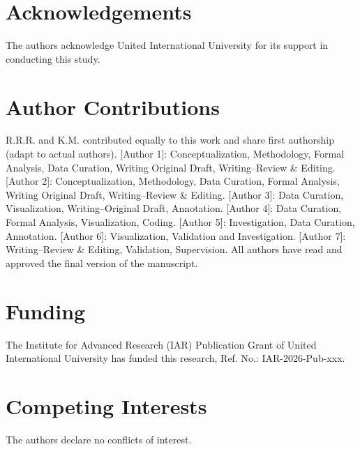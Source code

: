 \documentclass{article}
\begin{document}
\makeatletter
\renewcommand{\@biblabel}[1]{#1.\hfill}
\makeatother




\section*{Acknowledgements}
The authors acknowledge United International University for its support in conducting this study.

\section*{Author Contributions}
R.R.R. and K.M. contributed equally to this work and share first authorship (adapt to actual authors). [Author 1]: Conceptualization, Methodology, Formal Analysis, Data Curation, Writing Original Draft, Writing--Review \& Editing. [Author 2]: Conceptualization, Methodology, Data Curation, Formal Analysis, Writing Original Draft, Writing--Review \& Editing. [Author 3]: Data Curation, Visualization, Writing--Original Draft, Annotation. [Author 4]: Data Curation, Formal Analysis, Visualization, Coding. [Author 5]: Investigation, Data Curation, Annotation. [Author 6]: Visualization, Validation and Investigation. [Author 7]: Writing--Review \& Editing, Validation, Supervision.
All authors have read and approved the final version of the manuscript.

\section*{Funding}
The Institute for Advanced Research (IAR) Publication Grant of United International University has funded this research, Ref. No.: IAR-2026-Pub-xxx.

\section*{Competing Interests}
The authors declare no conflicts of interest.
\end{document}
